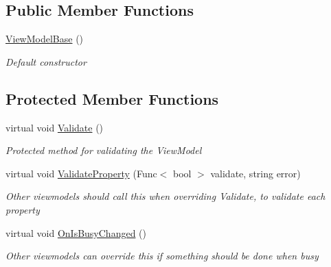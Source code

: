 \subsection*{Public Member Functions}
\begin{DoxyCompactItemize}
\item 
\hyperlink{class_field_service_1_1_view_models_1_1_view_model_base_aac15ea6fda5363b654314fc2060632d2}{View\+Model\+Base} ()
\begin{DoxyCompactList}\small\item\em Default constructor \end{DoxyCompactList}\end{DoxyCompactItemize}
\subsection*{Protected Member Functions}
\begin{DoxyCompactItemize}
\item 
virtual void \hyperlink{class_field_service_1_1_view_models_1_1_view_model_base_a872d3f368bf241242ff6cff4589c54d8}{Validate} ()
\begin{DoxyCompactList}\small\item\em Protected method for validating the View\+Model \end{DoxyCompactList}\item 
virtual void \hyperlink{class_field_service_1_1_view_models_1_1_view_model_base_a814091201e60cc4fd3240a593cf26fd9}{Validate\+Property} (Func$<$ bool $>$ validate, string error)
\begin{DoxyCompactList}\small\item\em Other viewmodels should call this when overriding Validate, to validate each property \end{DoxyCompactList}\item 
virtual void \hyperlink{class_field_service_1_1_view_models_1_1_view_model_base_a6a7d9b80cff0d33e20451bccc7680e54}{On\+Is\+Busy\+Changed} ()
\begin{DoxyCompactList}\small\item\em Other viewmodels can override this if something should be done when busy \end{DoxyCompactList}\end{DoxyCompactItemize}
